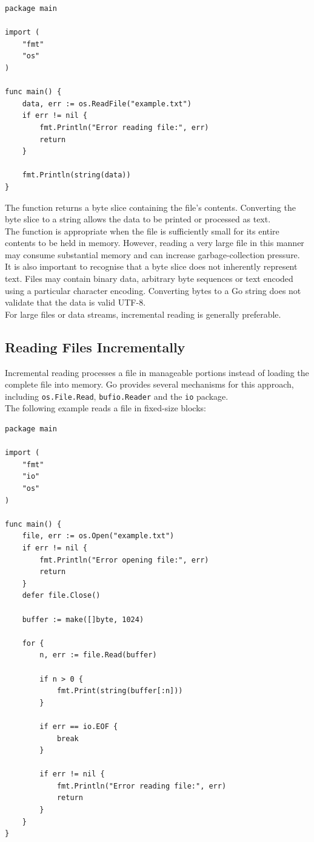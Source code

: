 \begin{lstlisting}
package main

import (
    "fmt"
    "os"
)

func main() {
    data, err := os.ReadFile("example.txt")
    if err != nil {
        fmt.Println("Error reading file:", err)
        return
    }

    fmt.Println(string(data))
}
\end{lstlisting}

The function returns a byte slice containing the file's contents. Converting the byte slice to a string allows the data to be printed or processed as text.\\

The function is appropriate when the file is sufficiently small for its entire contents to be held in memory. However, reading a very large file in this manner may consume substantial memory and can increase garbage-collection pressure.\\

It is also important to recognise that a byte slice does not inherently represent text. Files may contain binary data, arbitrary byte sequences or text encoded using a particular character encoding. Converting bytes to a Go string does not validate that the data is valid UTF-8.\\

For large files or data streams, incremental reading is generally preferable.

\subsection{Reading Files Incrementally}

Incremental reading processes a file in manageable portions instead of loading the complete file into memory. Go provides several mechanisms for this approach, including \texttt{os.File.Read}, \texttt{bufio.Reader} and the \texttt{io} package.\\

The following example reads a file in fixed-size blocks:

\begin{lstlisting}
package main

import (
    "fmt"
    "io"
    "os"
)

func main() {
    file, err := os.Open("example.txt")
    if err != nil {
        fmt.Println("Error opening file:", err)
        return
    }
    defer file.Close()

    buffer := make([]byte, 1024)

    for {
        n, err := file.Read(buffer)

        if n > 0 {
            fmt.Print(string(buffer[:n]))
        }

        if err == io.EOF {
            break
        }

        if err != nil {
            fmt.Println("Error reading file:", err)
            return
        }
    }
}
\end{lstlisting}

